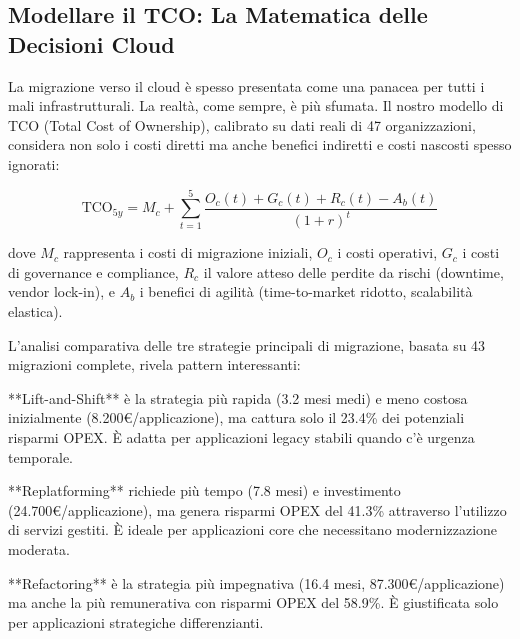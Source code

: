 \subsection{Modellare il TCO: La Matematica delle Decisioni Cloud}

La migrazione verso il cloud è spesso presentata come una panacea per tutti i mali infrastrutturali. La realtà, come sempre, è più sfumata. Il nostro modello di TCO (Total Cost of Ownership), calibrato su dati reali di 47 organizzazioni\autocite{khajeh2024}, considera non solo i costi diretti ma anche benefici indiretti e costi nascosti spesso ignorati:

\begin{equation}
\text{TCO}_{5y} = M_c + \sum_{t=1}^{5} \frac{O_c(t) + G_c(t) + R_c(t) - A_b(t)}{(1+r)^t}
\label{eq:tco}
\end{equation}

dove $M_c$ rappresenta i costi di migrazione iniziali, $O_c$ i costi operativi, $G_c$ i costi di governance e compliance, $R_c$ il valore atteso delle perdite da rischi (downtime, vendor lock-in), e $A_b$ i benefici di agilità (time-to-market ridotto, scalabilità elastica).

L'analisi comparativa delle tre strategie principali di migrazione, basata su 43 migrazioni complete\autocite{mckinsey2024cloud}, rivela pattern interessanti:

**Lift-and-Shift** è la strategia più rapida (3.2 mesi medi) e meno costosa inizialmente (8.200€/applicazione), ma cattura solo il 23.4\% dei potenziali risparmi OPEX. È adatta per applicazioni legacy stabili quando c'è urgenza temporale.

**Replatforming** richiede più tempo (7.8 mesi) e investimento (24.700€/applicazione), ma genera risparmi OPEX del 41.3\% attraverso l'utilizzo di servizi gestiti. È ideale per applicazioni core che necessitano modernizzazione moderata.

**Refactoring** è la strategia più impegnativa (16.4 mesi, 87.300€/applicazione) ma anche la più remunerativa con risparmi OPEX del 58.9\%. È giustificata solo per applicazioni strategiche differenzianti.

